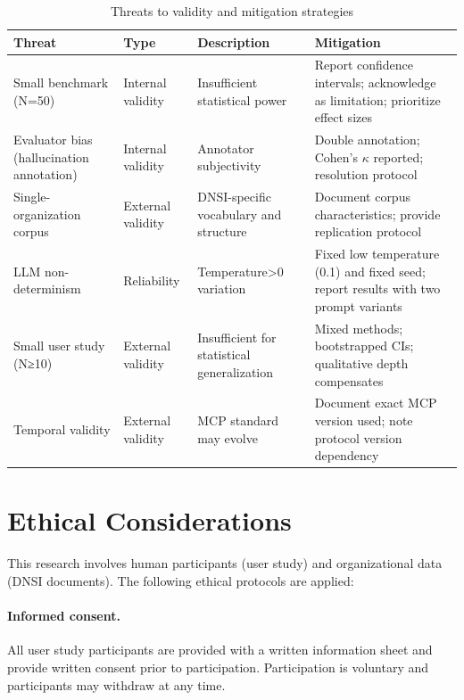 \begin{table}[H]
\centering
\caption{Threats to validity and mitigation strategies}
\label{tab:validity}
\begin{tabularx}{\textwidth}{@{}llXX@{}}
\toprule
\textbf{Threat} & \textbf{Type} & \textbf{Description} & \textbf{Mitigation} \\
\midrule
Small benchmark (N=50) & Internal validity & Insufficient statistical power & Report confidence intervals; acknowledge as limitation; prioritize effect sizes \\
Evaluator bias (hallucination annotation) & Internal validity & Annotator subjectivity & Double annotation; Cohen's $\kappa$ reported; resolution protocol \\
Single-organization corpus & External validity & DNSI-specific vocabulary and structure & Document corpus characteristics; provide replication protocol \\
LLM non-determinism & Reliability & Temperature>0 variation & Fixed low temperature (0.1) and fixed seed; report results with two prompt variants \\
Small user study (N≥10) & External validity & Insufficient for statistical generalization & Mixed methods; bootstrapped CIs; qualitative depth compensates \\
Temporal validity & External validity & MCP standard may evolve & Document exact MCP version used; note protocol version dependency \\
\bottomrule
\end{tabularx}
\end{table}

\section{Ethical Considerations}
\label{sec:method-ethics}

This research involves human participants (user study) and organizational data (DNSI documents). The following ethical protocols are applied:

\paragraph{Informed consent.} All user study participants are provided with a written information sheet and provide written consent prior to participation. Participation is voluntary and participants may withdraw at any time.


